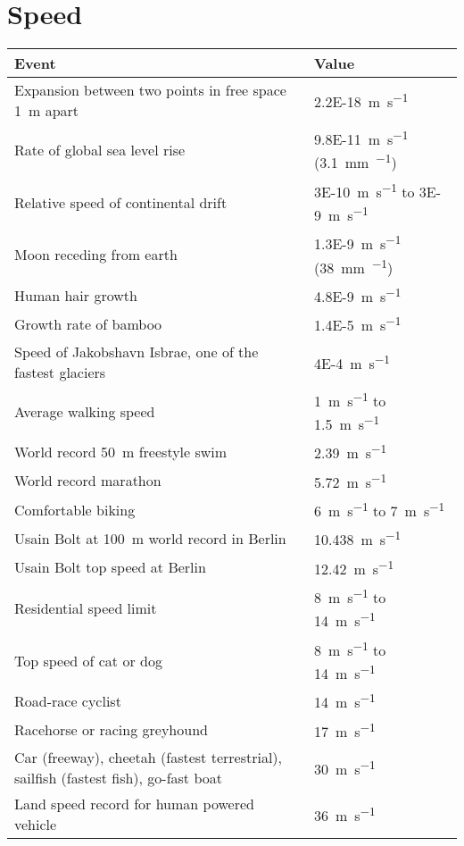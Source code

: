 \documentclass{article}
\begin{document}
\section{Speed}
\begin{table}[H]
	\centering
	\begin{tabularx}{\textwidth}{ X X }
		Event & Value \\
		\hline
		Expansion between two points in free space \SI{1}{\meter} apart & \SI{2.2E-18}{\meter\per\second} \\
		Rate of global sea level rise & \SI{9.8E-11}{\meter\per\second} (\SI{3.1}{\milli\meter\per\year}) \\
		Relative speed of continental drift & \SI{3E-10}{\meter\per\second} to \SI{3E-9}{\meter\per\second} \\
		Moon receding from earth & \SI{1.3E-9}{\meter\per\second} (\SI{38}{\milli\meter\per\year}) \\
		Human hair growth & \SI{4.8E-9}{\meter\per\second} \\
		Growth rate of bamboo & \SI{1.4E-5}{\meter\per\second} \\
		Speed of Jakobshavn Isbrae, one of the fastest glaciers & \SI{4E-4}{\meter\per\second} \\
		Average walking speed & \SI{1}{\meter\per\second} to \SI{1.5}{\meter\per\second} \\
		World record \SI{50}{\meter} freestyle swim & \SI{2.39}{\meter\per\second} \\
		World record marathon & \SI{5.72}{\meter\per\second} \\
		Comfortable biking & \SI{6}{\meter\per\second} to \SI{7}{\meter\per\second} \\
		Usain Bolt at \SI{100}{\meter} world record in Berlin & \SI{10.438}{\meter\per\second} \\
		Usain Bolt top speed at Berlin & \SI{12.42}{\meter\per\second} \\
		Residential speed limit & \SI{8}{\meter\per\second} to \SI{14}{\meter\per\second} \\
		Top speed of cat or dog & \SI{8}{\meter\per\second} to \SI{14}{\meter\per\second} \\
		Road-race cyclist & \SI{14}{\meter\per\second} \\
		Racehorse or racing greyhound & \SI{17}{\meter\per\second} \\
		Car (freeway), cheetah (fastest terrestrial), sailfish (fastest fish), go-fast boat & \SI{30}{\meter\per\second} \\
		Land speed record for human powered vehicle & \SI{36}{\meter\per\second} \\

\end{tabularx}
\end{table}
\end{document}
